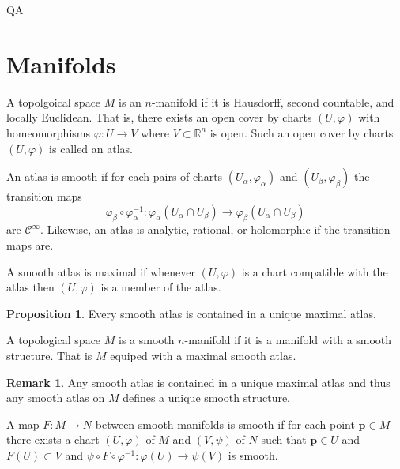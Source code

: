QA	 \documentclass[12pt]{extarticle}
\newcommand{\R}{\mathbb{R}}
\theoremstyle{definition}
\newtheorem{proposition}[theorem]{Proposition}
\newtheorem{remark}{Remark}
\newenvironment{definition}[1][Definition:]{\begin{trivlist}
\item[\hskip \labelsep {\bfseries #1}]}{\end{trivlist}}
\renewcommand{\bf}[1]{\mathbf{#1}}
\newcommand{\C}[1]{\mathcal{C}^{#1}}
\begin{document}
\section{Manifolds}

\begin{definition}
A topolgoical space $M$ is an $n$-manifold if it is Hausdorff, second countable, and locally Euclidean. That is, there exists an open cover by charts $(U, \varphi)$ with homeomorphisms $\varphi : U \to V$ where $V \subset \R^n$ is open. Such an open cover by charts $(U, \varphi)$ is called an atlas.    
\end{definition}

\begin{definition}
An atlas is smooth if for each pairs of charts $(U_{\alpha}, \varphi_{\alpha})$ and $(U_{\beta}, \varphi_{\beta})$ the transition maps 
\[\varphi_{\beta} \circ \varphi_{\alpha}^{-1} : \varphi_{\alpha}(U_{\alpha} \cap U_{\beta}) \to \varphi_{\beta}(U_{\alpha} \cap U_{\beta}) \]
are $\C{\infty}$. Likewise, an atlas is analytic, rational, or holomorphic if the transition maps are.  
\end{definition}

\begin{definition}
A smooth atlas is maximal if whenever $(U, \varphi)$ is a chart compatible with the atlas then $(U, \varphi)$ is a member of the atlas. 
\end{definition}

\begin{proposition}
Every smooth atlas is contained in a unique maximal atlas.
\end{proposition}

\begin{definition}
A topological space $M$ is a smooth $n$-manifold if it is a manifold with a smooth structure. That is $M$ equiped with a maximal smooth atlas. 
\end{definition}

\begin{remark}
Any smooth atlas is contained in a unique maximal atlas and thus any smooth atlas on $M$ defines a unique smooth structure. 
\end{remark}

\begin{definition}
A map $F : M \to N$ between smooth manifolds is smooth if for each point $\bf{p} \in M$ there exists a chart $(U, \varphi)$ of $M$ and $(V, \psi)$ of $N$ such that $\bf{p} \in U$ and $F(U) \subset V$ and $\psi \circ F \circ \varphi^{-1} : \varphi(U) \to \psi(V)$ is smooth. 
\end{definition}
\end{document}
